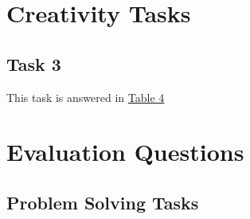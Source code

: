 \documentclass[stu,12pt,floatsintext]{apa7}
\begin{document}
\section{Creativity Tasks}

\subsection{Task 3}

This task is answered in \hyperref[tab:table4]{Table 4}

\section{Evaluation Questions}

\subsection{Problem Solving Tasks}
\end{document}
